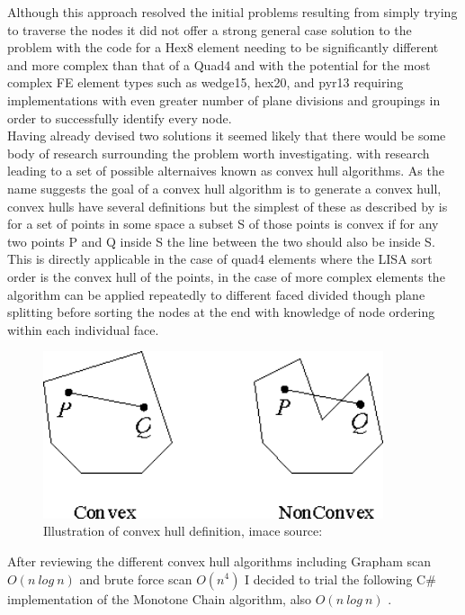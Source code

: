 \noindent
Although this approach resolved the initial problems resulting from simply trying to traverse the nodes it did not offer a strong general case solution to the problem with the code for a Hex8 element needing to be significantly different and more complex than that of a Quad4 and with the potential for the most complex FE element types such as wedge15, hex20, and pyr13 requiring implementations with even greater number of plane divisions and groupings in order to successfully identify every node. \\ 


\noindent
Having already devised two solutions it seemed likely that there would be some body of research surrounding the problem worth investigating. with research leading to a set of possible alternaives known as convex hull algorithms. As the name suggests the goal of a convex hull algorithm is to generate a convex hull, convex hulls have several definitions but the simplest of these as described by \cite{ConvexHulls} is for a set of points in some space a subset S of those points is convex if for any two points P and Q  inside S the line between the two should also be inside S. This is directly applicable in the case of quad4 elements where the LISA sort order is the convex hull of the points, in the case of more complex elements the algorithm can be applied repeatedly to different faced divided though plane splitting before sorting the nodes at the end with knowledge of node ordering within each individual face. \\ 

\begin{figure}[!h]
  \centerline{\includegraphics[width=100mm , scale=1]{../Graphics/ConvexHullGraphic.png}}
  \caption{Illustration of convex hull definition, imace source: \cite{ConvexHulls}
  }
  \label{fig:h-refinementImp}
\end{figure}

\noindent
After reviewing the different convex hull algorithms including Grapham scan \cite{GrahamScan} $O(n\ log\ n)$ and brute force scan $O(n^4)$ \cite{ConvexHulls} \cite{BruteConvex} I decided to trial the following C\# implementation of the Monotone Chain algorithm, also $O(n\ log\ n)$ \cite{CSharpConvexHull}. \\ \\ \\ \\

